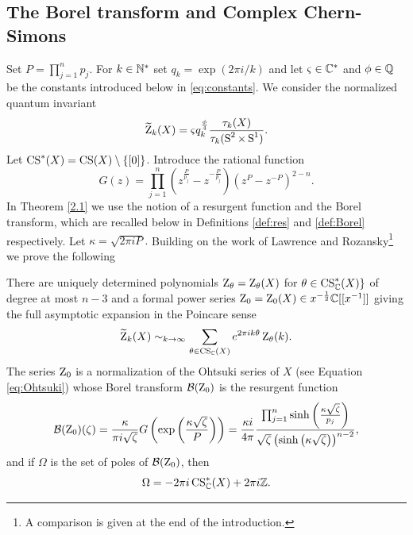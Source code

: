 \subsection*{The Borel transform and Complex Chern-Simons} Set $P=\prod_{j=1}^n p_j.$ For $k\in \mathbb{N}^*$ set $q_k=\exp(2\pi i/k)$ and let $\varsigma \in \mathbb{C}^*$ and $ \phi \in \mathbb{Q}$ be the constants introduced below in \eqref{eq:constants}. We consider the normalized quantum invariant
\begin{equation}
\label{def:normquant}
\widetilde{\operatorname{Z}} _k(X)= \varsigma q_k^{\frac{\phi}{4}}  \frac{\tau_k(X)}{\tau_k(\operatorname{S}^2\times \operatorname{S}^1)} .
\end{equation} 
Let $\operatorname{CS}^*(X)=\operatorname{CS}(X)\setminus \{[0]\}$. Introduce the rational function
\begin{equation} \label{eq:G} G(z)=\prod_{j=1}^n\left(z^{\frac{P}{p_j}}-z^{-\frac{P}{p_j}}\right)\left(z^P-z^{-P}\right)^{2-n}.
\end{equation} 
In Theorem \ref{2.1} we use the notion of a resurgent function and the Borel transform, which are recalled below in Definitions \ref{def:res} and \ref{def:Borel} respectively. Let $\kappa=\sqrt{2\pi i P}.$ Building on the work of Lawrence and Rozansky\footnote{A comparison is given at the end of the introduction.}  \cite{LawrenceRozansky} we prove the following %
\begin{theorem} \label{2.1}
	There are uniquely determined polynomials $\operatorname{Z}_{\theta} = \operatorname{Z}_{\theta}(X)$ for $\theta \in\operatorname{CS}^*_{\mathbb{C}}(X)\}$ of degree at most $n-3$ and a formal power series $\operatorname{Z}_{0}=\operatorname{Z}_{0}(X) \in x^{-\frac{1}{2}}\mathbb{C}[[x^{-1}]]$ giving the full asymptotic expansion in the Poincare sense
	\begin{equation} \label{EXPANSIOON}
	\widetilde{\operatorname{Z}} _k(X) \sim_{k \rightarrow \infty} \sum_{\theta \in \operatorname{CS}_{\mathbb{C}}(X)} e^{2\pi ik \theta}\operatorname{Z}_{\theta}(k).  
	\end{equation}
	The series $\operatorname{Z}_0$ is a normalization of the Ohtsuki series of $X$ (see Equation \eqref{eq:Ohtsuki}) whose Borel transform 
	$\mathcal{B}(\operatorname{Z}_{0})$ is the resurgent function 
	\begin{equation} \label{ComputingBorel}
	\mathcal{B}(\operatorname{Z}_{0})(\zeta)  = \frac{\kappa}{\pi i \sqrt{\zeta}} G\left( \exp\left(\frac{\kappa\sqrt{\zeta}}{P} \right)\right)= \frac{\kappa i}{4\pi } \frac{\prod_{j=1}^n \sinh\left(\frac{\kappa\sqrt{\zeta}}{p_j}\right)}{ \sqrt{\zeta} \left(\sinh\left(\kappa\sqrt{\zeta}\right)\right)^{n-2}},
	\end{equation} and if $\Omega$ is the set of poles of $\mathcal{B}(\operatorname{Z}_{0})$, then
	\begin{equation} \label{Inclu}
\Omega =-2\pi i \operatorname{CS}_{\mathbb{C}}^*(X)+ 2\pi i \mathbb{Z}.
	\end{equation} 

\end{theorem}   



